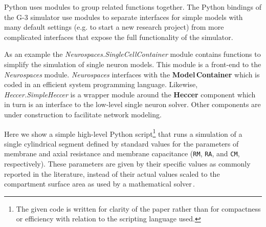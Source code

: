 \documentclass[12pt]{article}
\begin{document}
Python uses modules to group related functions together.  The Python
bindings of the G-3 simulator use modules to separate interfaces for
simple models with many default settings (e.g. to start a new research
project) from more complicated interfaces that expose the full
functionality of the simulator.

As an example the {\it Neurospaces.SingleCellContainer} module
contains functions to simplify the simulation of single neuron models.
This module is a front-end to the {\it Neurospaces} module.  {\it
  Neurospaces} interfaces with the {\bf Model\,Container} which is coded in
an efficient system programming language.  Likewise, {\it
  Heccer.SimpleHeccer} is a wrapper module around the {\bf Heccer}
component which in turn is an interface to the low-level single neuron
solver.  Other components are under construction to facilitate network
modeling.

Here we show a simple high-level Python script\footnote{The given code
  is written for clarity of the paper rather than for compactness or
  efficiency with relation to the scripting language used.} that runs
a simulation of a single cylindrical segment defined by standard
values for the parameters of membrane and axial resistance and
membrane capacitance ({\tt RM}, {\tt RA},
and {\tt CM}, respectively).  These parameters are given by their
specific values as commonly reported in the literature, instead of
their actual values scaled to the compartment surface area as used by
a mathematical solver\,\cite{cornelis04:_neuros_param_handl}.
\end{document}

